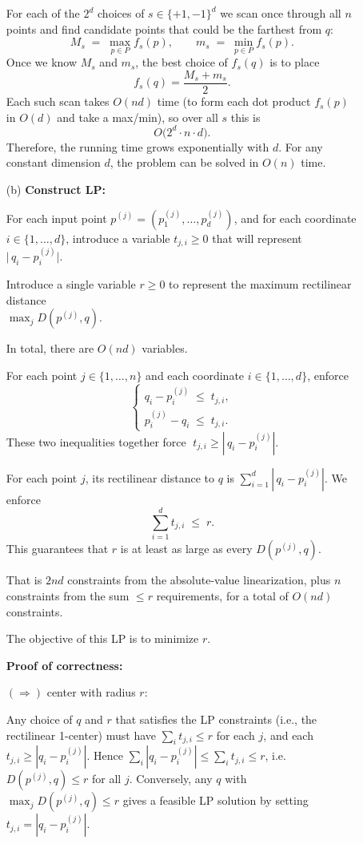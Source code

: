 \documentclass[11pt]{article}
\begin{document}
\begin{description}
\begin{enumerate}
  For each of the $2^d$ choices of $s\in\{+1,-1\}^d$ we scan once through all $n$ points and find candidate points that could be the farthest from $q$:
  \[
  M_s \;=\;\max_{p\in P}f_s(p),
  \qquad
  m_s \;=\;\min_{p\in P}f_s(p).
  \]
  Once we know $M_s$ and $m_s$, the best choice of $f_s(q)$ is to place
  \[
  f_s(q)=\frac{M_s + m_s}{2}.
  \]
  Each such scan takes $O(nd)$ time (to form each dot product $f_s(p)$ in $O(d)$ and take a max/min), so over all $s$ this is
  \[
  O\bigl(2^d\cdot n\cdot d\bigr).
  \]
  Therefore, the running time grows exponentially with $d$. 
  For any constant dimension $d$, the problem can be solved in $O(n)$ time.

  \item[(b)]
  \textbf{Construct LP:}

  For each input point \(p^{(j)}=(p^{(j)}_1,\dots,p^{(j)}_d)\), 
  and for each coordinate \(i\in\{1,\dots,d\}\), introduce a variable \(t_{j,i}\ge0\)
  that will represent \(\bigl|\,q_i - p^{(j)}_i\bigr|\).

  Introduce a single variable \(r\ge0\) to represent the maximum rectilinear distance \\
  \(\max_j D(p^{(j)},q)\).

  In total, there are $O(nd)$ variables.

  For each point \(j\in\{1,\dots,n\}\) and each coordinate \(i\in\{1,\dots,d\}\), enforce
  \[
    \begin{cases}
      q_i - p^{(j)}_i \;\le\; t_{j,i},\\
      p^{(j)}_i - q_i \;\le\; t_{j,i}.
    \end{cases}
  \]
  These two inequalities together force 
  \(\;t_{j,i} \ge |\,q_i - p^{(j)}_i|\).  

  For each point \(j\), its rectilinear distance to \(q\) is
  \(\sum_{i=1}^d |\,q_i - p^{(j)}_i|\).  We enforce
  \[
    \sum_{i=1}^d t_{j,i}
    \;\le\; r.
  \]
  This guarantees that \(r\) is at least as large as every \(D(p^{(j)},q)\).

  That is \(2nd\) constraints from the absolute-value linearization, 
  plus \(n\) constraints from the sum $\le r$ requirements, 
  for a total of $O(nd)$ constraints.

  The objective of this LP is to minimize $r$.
  
  \textbf{Proof of correctness:}

  \((\Longrightarrow)\) center with radius \(r\):

  Any choice of \(q\) and \(r\) that satisfies the LP constraints 
  (i.e., the rectilinear 1-center) must have  
  \(\sum_i t_{j,i}\le r\) for each \(j\), and each \(t_{j,i}\ge |q_i - p^{(j)}_i|\).  Hence  
  \(\sum_i |q_i - p^{(j)}_i| \le \sum_i t_{j,i} \le r\), i.e.\ \(D(p^{(j)},q)\le r\) for all \(j\).  
  Conversely, any \(q\) with \(\max_j D(p^{(j)},q)\le r\) gives a feasible LP solution by setting \(t_{j,i}=|q_i-p^{(j)}_i|\).


\end{enumerate}
\end{description}
\end{document}
